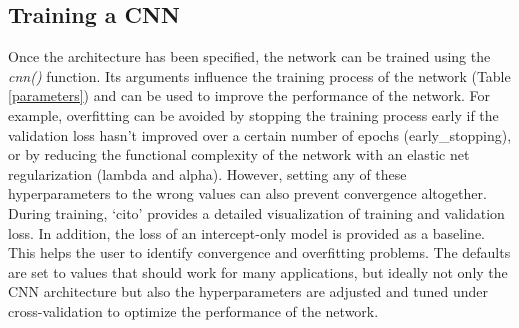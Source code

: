 \documentclass{article}
\newcommand{\pkg}[1]{`#1'}
\newcommand{\fn}[2][]{\textit{#2(}#1\textit{)}}
\begin{document}
\begin{table}
	\label{layers}
\end{table}

\subsection{Training a CNN}
Once the architecture has been specified, the network can be trained using the \fn{cnn} function. Its arguments influence the training process of the network (Table \ref{parameters}) and can be used to improve the performance of the network. For example, overfitting can be avoided by stopping the training process early if the validation loss hasn't improved over a certain number of epochs (early\_stopping), or by reducing the functional complexity of the network with an elastic net regularization (lambda and alpha). However, setting any of these hyperparameters to the wrong values can also prevent convergence altogether. During training, \pkg{cito} provides a detailed visualization of training and validation loss. In addition, the loss of an intercept-only model is provided as a baseline. This helps the user to identify convergence and overfitting problems. 
The defaults are set to values that should work for many applications, but ideally not only the CNN architecture but also the hyperparameters are adjusted and tuned under cross-validation to optimize the performance of the network.
\end{document}
